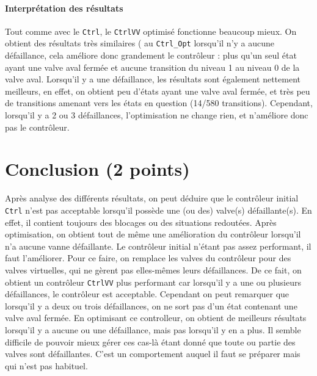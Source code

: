 \documentclass[a4paper]{book}
\begin{document}
\paragraph{Interprétation des résultats}
Tout comme avec le {\tt Ctrl}, le {\tt CtrlVV} optimisé fonctionne beaucoup mieux. 
On obtient des résultats très similaires ( au {\tt Ctrl\_Opt} lorsqu'il n'y a aucune défaillance, cela améliore donc grandement le contrôleur : plus qu'un seul état ayant une valve aval fermée et aucune 
transition du niveau 1 au niveau 0 de la valve aval. Lorsqu'il y a une défaillance, les résultats sont également nettement meilleurs, 
en effet, on obtient peu d'états ayant une valve aval fermée, et très peu de transitions amenant vers les états en question (14/580 transitions).
Cependant, lorsqu'il y a 2 ou 3 défaillances, l'optimisation ne change rien, et n'améliore donc pas le contrôleur. 

\section{Conclusion (2 points)}
Après analyse des différents résultats, on peut déduire que le contrôleur initial {\tt Ctrl} n'est pas acceptable lorsqu'il possède une (ou des) valve(s) défaillante(s). 
En effet, il  contient toujours des blocages ou des situations redoutées. Après optimisation, on obtient tout de même une amélioration du contrôleur lorsqu'il n'a aucune vanne défaillante.
Le contrôleur initial n’étant pas assez performant, il faut l'améliorer. Pour ce faire, on remplace les valves du contrôleur pour des valves virtuelles, qui ne gèrent 
pas elles-mêmes leurs défaillances. De ce fait, on obtient un contrôleur {\tt CtrlVV} plus performant car lorsqu'il y a une ou plusieurs défaillances, le contrôleur est acceptable.
Cependant on peut remarquer que lorsqu'il y a deux ou trois défaillances, on ne sort pas d'un état contenant une valve aval fermée. En optimisant ce controlleur, on obtient de meilleurs résultats lorsqu'il y a
aucune ou une défaillance, mais pas lorsqu'il y en a plus. Il semble difficile de pouvoir mieux gérer ces cas-là étant donné que toute ou partie des valves sont défaillantes. C'est un comportement auquel il 
faut se préparer mais qui n'est pas habituel.
\end{document}
